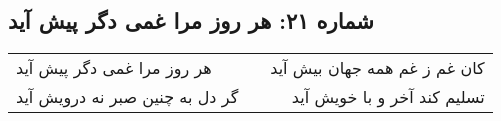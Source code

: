 \begin{center}
\section*{شماره ۲۱: هر روز مرا غمی دگر پیش آید}
\label{sec:021}
\begin{longtable}{l p{0.5cm} r}
هر روز مرا غمی دگر پیش آید
&&
کان غم ز غم همه جهان بیش آید
\\
گر دل به چنین صبر نه درویش آید
&&
تسلیم کند آخر و با خویش آید
\\
\end{longtable}
\end{center}
